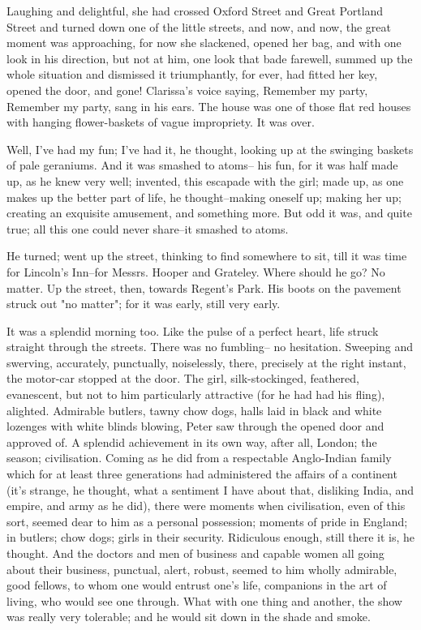 \documentclass[lang=cn,10pt]{elegantbook}
\begin{document}
Laughing and delightful, she had crossed Oxford Street and Great
Portland Street and turned down one of the little streets, and now,
and now, the great moment was approaching, for now she slackened,
opened her bag, and with one look in his direction, but not at him,
one look that bade farewell, summed up the whole situation and
dismissed it triumphantly, for ever, had fitted her key, opened the
door, and gone!  Clarissa's voice saying, Remember my party,
Remember my party, sang in his ears.  The house was one of those
flat red houses with hanging flower-baskets of vague impropriety.
It was over.

Well, I've had my fun; I've had it, he thought, looking up at the
swinging baskets of pale geraniums.  And it was smashed to atoms--
his fun, for it was half made up, as he knew very well; invented,
this escapade with the girl; made up, as one makes up the better
part of life, he thought--making oneself up; making her up;
creating an exquisite amusement, and something more.  But odd it
was, and quite true; all this one could never share--it smashed to
atoms.

He turned; went up the street, thinking to find somewhere to sit,
till it was time for Lincoln's Inn--for Messrs. Hooper and
Grateley.  Where should he go?  No matter.  Up the street, then,
towards Regent's Park.  His boots on the pavement struck out "no
matter"; for it was early, still very early.

It was a splendid morning too.  Like the pulse of a perfect heart,
life struck straight through the streets.  There was no fumbling--
no hesitation.  Sweeping and swerving, accurately, punctually,
noiselessly, there, precisely at the right instant, the motor-car
stopped at the door.  The girl, silk-stockinged, feathered,
evanescent, but not to him particularly attractive (for he had had
his fling), alighted.  Admirable butlers, tawny chow dogs, halls
laid in black and white lozenges with white blinds blowing, Peter
saw through the opened door and approved of.  A splendid
achievement in its own way, after all, London; the season;
civilisation.  Coming as he did from a respectable Anglo-Indian
family which for at least three generations had administered the
affairs of a continent (it's strange, he thought, what a sentiment
I have about that, disliking India, and empire, and army as he
did), there were moments when civilisation, even of this sort,
seemed dear to him as a personal possession; moments of pride in
England; in butlers; chow dogs; girls in their security.
Ridiculous enough, still there it is, he thought.  And the doctors
and men of business and capable women all going about their
business, punctual, alert, robust, seemed to him wholly admirable,
good fellows, to whom one would entrust one's life, companions in
the art of living, who would see one through.  What with one thing
and another, the show was really very tolerable; and he would sit
down in the shade and smoke.
\end{document}
